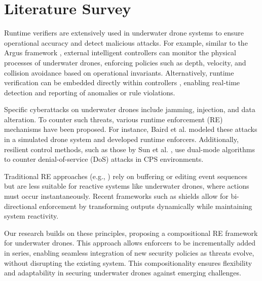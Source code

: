 


\section{Literature Survey}
\label{LiteratureSurvey}

Runtime verifiers are extensively used in underwater drone systems to ensure operational accuracy and detect malicious attacks. For example, similar to the Argus framework \cite{adepu2016argus}, external intelligent controllers can monitor the physical processes of underwater drones, enforcing policies such as depth, velocity, and collision avoidance based on operational invariants. Alternatively, runtime verification can be embedded directly within controllers \cite{adepu2017design}, enabling real-time detection and reporting of anomalies or rule violations.

Specific cyberattacks on underwater drones include jamming, injection, and data alteration. To counter such threats, various runtime enforcement (RE) mechanisms have been proposed. For instance, Baird et al. \cite{baird2022runtime} modeled these attacks in a simulated drone system and developed runtime enforcers. Additionally, resilient control methods, such as those by Sun et al. \cite{sun2019resilient}, use dual-mode algorithms to counter denial-of-service (DoS) attacks in CPS environments.

Traditional RE approaches (e.g., \cite{FalconeMFR11,RuntimeNonSafety}) rely on buffering or editing event sequences but are less suitable for reactive systems like underwater drones, where actions must occur instantaneously. Recent frameworks such as shields \cite{BloemKKW15,spin17} allow for bi-directional enforcement by transforming outputs dynamically while maintaining system reactivity.

Our research builds on these principles, proposing a compositional RE framework for underwater drones. This approach allows enforcers to be incrementally added in series, enabling seamless integration of new security policies as threats evolve, without disrupting the existing system. This compositionality ensures flexibility and adaptability in securing underwater drones against emerging challenges.

